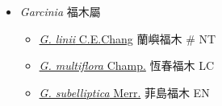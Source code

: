 
  \begin{itemize}
 \item[] \textit{Garcinia} 福木屬
                                
  \begin{itemize}
        \item[] \href{http://www.theplantlist.org/tpl1.1/search?q=Garcinia+linii}{\textit{G. linii} C.E.Chang}   蘭嶼福木  \# NT
        \item[] \href{http://www.theplantlist.org/tpl1.1/search?q=Garcinia+multiflora}{\textit{G. multiflora} Champ.}   恆春福木   LC
        \item[] \href{http://www.theplantlist.org/tpl1.1/search?q=Garcinia+subelliptica}{\textit{G. subelliptica} Merr.}   菲島福木   EN
  \end{itemize}
  \end{itemize}
